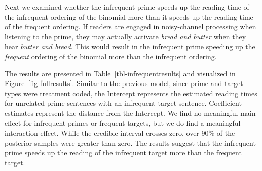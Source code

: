 \documentclass[
  12pt,
]{scrartcl}
\begin{document}
\begin{table}

\caption{\label{tbl-frequentresults}Results of the statistical model for
the frequent vs unrelated prime.}


\end{table}%

Next we examined whether the infrequent prime speeds up the reading time
of the infrequent ordering of the binomial more than it speeds up the
reading time of the frequent ordering. If readers are engaged in
noisy-channel processing when listening to the prime, they may actually
activate \emph{bread and butter} when they hear \emph{butter and bread}.
This would result in the infrequent prime speeding up the
\emph{frequent} ordering of the binomial more than the infrequent
ordering.

The results are presented in Table~\ref{tbl-infrequentresults} and
visualized in Figure~\ref{fig-fullresults}. Similar to the previous
model, since prime and target types were treatment coded, the Intercept
represents the estimated reading times for unrelated prime sentences
with an infrequent target sentence. Coefficient estimates represent the
distance from the Intercept. We find no meaningful main-effect for
infrequent primes or frequent targets, but we do find a meaningful
interaction effect. While the credible interval crosses zero, over 90\%
of the posterior samples were greater than zero. The results suggest
that the infrequent prime speeds up the reading of the infrequent target
more than the frequent target.
\end{document}
